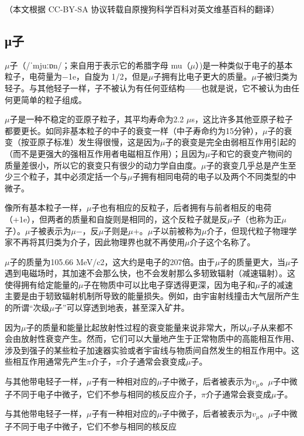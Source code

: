 

（本文根据 CC-BY-SA 协议转载自原搜狗科学百科对英文维基百科的翻译）
\subsection{μ子}

$\mu$子（/ˈmjuːɒn/；来自用于表示它的希腊字母 mu（$\mu$）)是一种类似于电子的基本粒子，电荷量为−1e，自旋为 1/2，但是$\mu$子拥有比电子更大的质量。$\mu$子被归类为轻子。与其他轻子一样，子不被认为有任何亚结构——也就是说，它不被认为由任何更简单的粒子组成。

$\mu$子是一种不稳定的亚原子粒子，其平均寿命为2.2 $\mu$s，这比许多其他亚原子粒子都要更长。如同非基本粒子的中子的衰变一样（中子寿命约为15分钟），$\mu$子的衰变（按亚原子标准）发生得很慢，这是因为$\mu$子的衰变是完全由弱相互作用引起的（而不是更强大的强相互作用者电磁相互作用）；且因为$\mu$子和它的衰变产物间的质量差很小，所以它的衰变只有很少的动力学自由度。$\mu$子的衰变几乎总是产生至少三个粒子，其中必须定括一个与$\mu$子拥有相同电荷的电子以及两个不同类型的中微子。

像所有基本粒子一样，$\mu$子也有相应的反粒子，后者拥有与前者相反的电荷（+1e），但两者的质量和自旋则是相同的，这个反粒子就是反$\mu$子（也称为正$\mu$子）。$\mu$子被表示为$\mu$−，反$\mu$子则是$\mu$+。$\mu$子以前被称为$\mu$介子，但现代粒子物理学家不再将其归类为介子，因此物理界也就不再使用$\mu$介子这个名称了。

$\mu$子的质量为105.66 MeV/c2，这大约是电子的207倍。由于$\mu$子的质量更大，当$\mu$子遇到电磁场时，其加速不会那么快，也不会发射那么多轫致辐射（减速辐射）。这使得拥有给定能量的$\mu$子在物质中可以比电子穿透得更深，因为电子和$\mu$子的减速主要是由于轫致辐射机制所导致的能量损失。例如，由宇宙射线撞击大气层所产生的所谓“次级$\mu$子”可以穿透到地表，甚至深入矿井。

因为$\mu$子的质量和能量比起放射性过程的衰变能量来说非常大，所以$\mu$子从来都不会由放射性衰变产生。然而，它们可以大量地产生于正常物质中的高能相互作用、涉及到强子的某些粒子加速器实验或者宇宙线与物质间自然发生的相互作用中。这些相互作用通常先产生$\pi$介子，$\pi$介子通常会衰变成$\mu$子。

与其他带电轻子一样，$\mu$子有一种相对应的$\mu$子中微子，后者被表示为$v_\mu$。$\mu$子中微子不同于电子中微子，它们不参与相同的核反应介子，$\pi$介子通常会衰变成$\mu$子。

与其他带电轻子一样，$\mu$子有一种相对应的$\mu$子中微子，后者被表示为$v_\mu$。$\mu$子中微子不同于电子中微子，它们不参与相同的核反应

